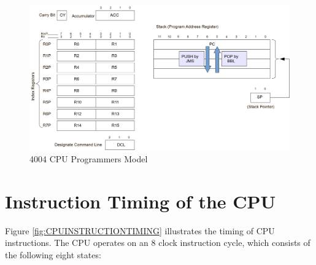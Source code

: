 \begin{figure}[h]
    \includegraphics[width=0.75\columnwidth]{./Figure/CPUProgrammersModel.png}
    \caption{4004 CPU Programmers Model}
    \label{fig:CPUPROGRAMMERSMODEL}
\end{figure}

\section{Instruction Timing of the CPU}
Figure \ref{fig:CPUINSTRUCTIONTIMING} illustrates the timing of CPU instructions. The CPU operates on an 8 clock instruction cycle, which consists of the following eight states:

